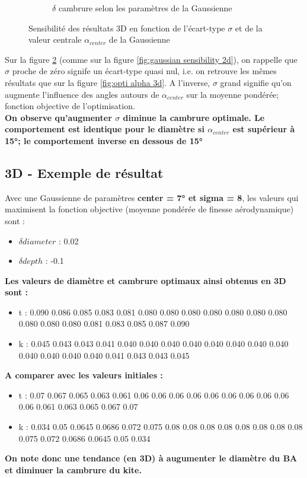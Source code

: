 \begin{figure}[h!]
\begin{subfigure}[b]{0.45\textwidth}
        \caption{$\delta$ cambrure selon les paramètres de la Gaussienne}
        \label{fig:cambrure gaussien}
    \end{subfigure}
    \caption{Sensibilité des résultats 3D en fonction de l'écart-type $\sigma$ et de la valeur centrale $\alpha_{center}$ de la Gaussienne}
    \label{fig:gaussian sensibility}
\end{figure}


    Sur la figure \ref{fig:gaussian sensibility} (comme sur la figure \ref{fig:gaussian sensibility 2d}), on rappelle que $\sigma$ proche de zéro signife un écart-type quasi nul, i.e. on retrouve les mêmes résultats que sur la figure \ref{fig:opti alpha 3d}. A l'inverse, $\sigma$ grand signifie qu'on augmente l'influence des angles autours de $\alpha_{center}$ sur la moyenne pondérée; fonction objective de l'optimisation. \\

    \textbf{ On observe qu'augmenter $\sigma$ diminue la cambrure optimale. Le comportement est identique pour le diamètre si $\alpha_{center}$ est supérieur à 15°; le comportement inverse en dessous de 15°}
    
\subsection{3D - Exemple de résultat}
\label{sec:Ch3.4}

Avec une Gaussienne de paramètres \textbf{center = 7° et sigma = 8}, les valeurs qui maximisent la fonction objective (moyenne pondérée de finesse aérodynamique) sont :
\begin{itemize}
    \item $\delta diameter$ : 0.02
    \item $\delta depth$ : -0.1
\end{itemize}
\smallskip

\textbf{Les valeurs de diamètre et cambrure optimaux ainsi obtenus en 3D sont : 
}
\begin{itemize}
    \item t : 0.090 0.086 0.085 0.083 0.081 0.080 0.080  0.080 0.080 0.080 0.080  0.080 0.080 0.080 0.080 0.081 0.083 0.085 0.087 0.090
    \item k : 0.045 0.043 0.043 0.041 0.040 0.040 0.040  0.040 0.040 0.040 0.040 0.040 0.040 0.040  0.040 0.040 0.041 0.043 0.043 0.045
\end{itemize}
\smallskip

\textbf{A comparer avec les valeurs initiales :}
\begin{itemize}
    \item t : 0.07 0.067 0.065 0.063 0.061 0.06 0.06  0.06 0.06 0.06  0.06  0.06 0.06 0.06  0.06 0.061 0.063 0.065 0.067 0.07
    \item k : 0.034 0.05 0.0645 0.0686 0.072 0.075 0.08 0.08 0.08 0.08 0.08 0.08 0.08 0.08 0.075 0.072 0.0686 0.0645 0.05 0.034
\end{itemize}

\textbf{On note donc une tendance (en 3D) à augumenter le diamètre du BA et diminuer la cambrure du kite. }
